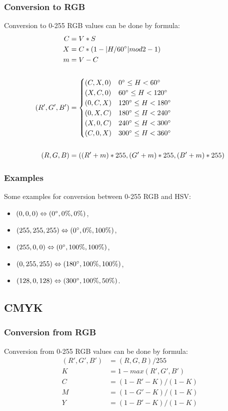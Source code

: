 \documentclass[titlepage]{article}
\begin{document}
\subsubsection{Conversion to RGB}
Conversion to 0-255 RGB values can be done by formula:
\begin{equation}
\begin{split}
C&=V*S\\
X&=C*(1-|H/60\degree|mod2-1)\\
m&=V-C\\
\\
(R', G', B')&=\begin{cases}
(C, X, 0) & 0\degree\leq H < 60\degree\\
(X, C, 0) & 60\degree\leq H < 120\degree\\
(0, C, X) & 120\degree\leq H<180\degree\\
(0, X, C) & 180\degree\leq H<240\degree\\
(X, 0, C) & 240\degree\leq H<300\degree\\
(C, 0, X) & 300\degree\leq H<360\degree
\end{cases}\\
\\
(R, G, B)&=((R'+m)*255, (G'+m)*255, (B'+m)*255)
\end{split}
\end{equation}

\subsubsection{Examples}
Some examples for conversion between 0-255 RGB and HSV:
\begin{itemize}
  \item $(0, 0, 0) \Leftrightarrow (0\degree, 0\%, 0\%)$,
  \item $(255, 255, 255) \Leftrightarrow (0\degree, 0\%, 100\%)$,
  \item $(255, 0, 0) \Leftrightarrow (0\degree, 100\%, 100\%)$,
  \item $(0, 255, 255) \Leftrightarrow (180\degree, 100\%, 100\%)$,
  \item $(128, 0, 128) \Leftrightarrow (300\degree, 100\%, 50\%)$.
\end{itemize}

\subsection{CMYK}
\subsubsection{Conversion from RGB}
Conversion from 0-255 RGB values can be done by formula:
\begin{equation}
\begin{split}
(R', G', B') &= (R, G, B)/255 \\
K&=1-max(R', G', B')\\
C&=(1-R'-K)/(1-K)\\
M&=(1-G'-K)/(1-K)\\
Y&=(1-B'-K)/(1-K)
\end{split}
\end{equation}
\end{document}
